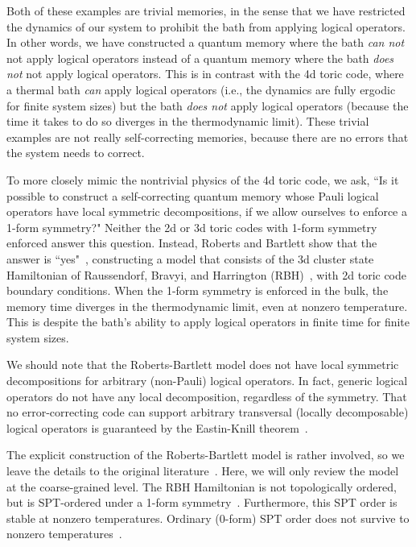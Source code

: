 Both of these examples are trivial memories, in the sense that we have restricted the dynamics of our system to prohibit the bath from applying logical operators. In other words, we have constructed a quantum memory where the bath \emph{can not} not apply logical operators instead of a quantum memory where the bath \emph{does not} not apply logical operators. This is in contrast with the 4d toric code, where a thermal bath \emph{can} apply logical operators (i.e., the dynamics are fully ergodic for finite system sizes) but the bath \emph{does not} apply logical operators (because the time it takes to do so diverges in the thermodynamic limit). These trivial examples are not really self-correcting memories, because there are no errors that the system needs to correct.

To more closely mimic the nontrivial physics of the 4d toric code, we ask, ``Is it possible to construct a self-correcting quantum memory whose Pauli logical operators have local symmetric decompositions, if we allow ourselves to enforce a 1-form symmetry?" Neither the 2d or 3d toric codes with 1-form symmetry enforced answer this question. Instead, Roberts and Bartlett show that the answer is ``yes"~\cite{RobertsBartlett2020}, constructing a model that consists of the 3d cluster state Hamiltonian of Raussendorf, Bravyi, and Harrington (RBH)~\cite{Raussendorf2005LongRange}, with 2d toric code boundary conditions. 
When the 1-form symmetry is enforced in the bulk, the memory time diverges in the thermodynamic limit, even at nonzero temperature. This is despite the bath's ability to apply logical operators in finite time for finite system sizes.

We should note that the Roberts-Bartlett model does not have local symmetric decompositions for arbitrary (non-Pauli) logical operators. In fact, generic logical operators do not have any local decomposition, regardless of the symmetry. That no error-correcting code can support arbitrary transversal (locally decomposable) logical operators is guaranteed by the Eastin-Knill theorem~\cite{EastinKnill2009}.

The explicit construction of the Roberts-Bartlett model is rather involved, so we leave the details to the original literature~\cite{RobertsBartlett2020}. Here, we will only review the model at the coarse-grained level.
The RBH Hamiltonian is not topologically ordered, but is SPT-ordered under a 1-form symmetry~\cite{Roberts2017SPTO}. Furthermore, this SPT order is stable at nonzero temperatures. Ordinary (0-form) SPT order does not survive to nonzero temperatures~\cite{Roberts2017SPTO}.

